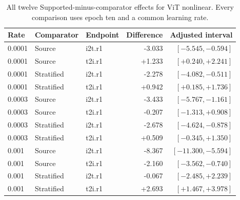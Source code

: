\begin{table}[t]
\centering
\small
\setlength{\tabcolsep}{3pt}
\begin{tabular}{lllrr}
\toprule
Rate & Comparator & Endpoint & Difference & Adjusted interval\\
\midrule
0.0001 & Source & i2t.r1 & -3.033 & $[-5.545,-0.594]$ \\
0.0001 & Source & t2i.r1 & +1.233 & $[+0.240,+2.241]$ \\
0.0001 & Stratified & i2t.r1 & -2.278 & $[-4.082,-0.511]$ \\
0.0001 & Stratified & t2i.r1 & +0.942 & $[+0.185,+1.736]$ \\
0.0003 & Source & i2t.r1 & -3.433 & $[-5.767,-1.161]$ \\
0.0003 & Source & t2i.r1 & -0.207 & $[-1.313,+0.908]$ \\
0.0003 & Stratified & i2t.r1 & -2.678 & $[-4.624,-0.878]$ \\
0.0003 & Stratified & t2i.r1 & +0.509 & $[-0.345,+1.350]$ \\
0.001 & Source & i2t.r1 & -8.367 & $[-11.300,-5.594]$ \\
0.001 & Source & t2i.r1 & -2.160 & $[-3.562,-0.740]$ \\
0.001 & Stratified & i2t.r1 & -0.067 & $[-2.485,+2.239]$ \\
0.001 & Stratified & t2i.r1 & +2.693 & $[+1.467,+3.978]$ \\
\bottomrule
\end{tabular}
\caption{All twelve Supported-minus-comparator effects for ViT nonlinear. Every comparison uses epoch ten and a common learning rate.}\label{tab:nonlinearpartial}
\end{table}


